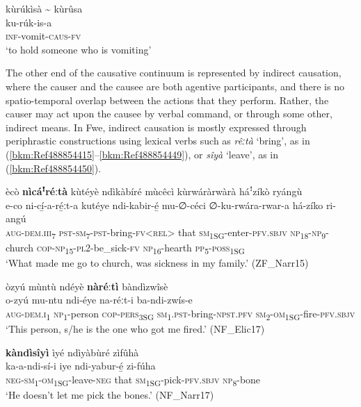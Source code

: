 \ea
\label{bkm:Ref99027269}
kùrúkìsà {\textasciitilde} kùrûsa\\
ku-rúk-is-a\\
\textsc{inf}-vomit-\textsc{caus}-\textsc{fv}\\
\glt ‘to hold someone who is vomiting’
\z

The other end of the causative continuum is represented by indirect causation, where the causer and the causee are both agentive participants, and there is no spatio-temporal overlap between the actions that they perform. Rather, the causer may act upon the causee by verbal command, or through some other, indirect means. In Fwe, indirect causation is mostly expressed through periphrastic constructions using lexical verbs such as \textit{rêːtà} ‘bring’, as in (\ref{bkm:Ref488854415}--\ref{bkm:Ref488854449}), or \textit{sîyà} ‘leave’, as in (\ref{bkm:Ref488854450}).

\ea
\label{bkm:Ref488854415}
ècò \textbf{nìcáꜝ}\textbf{réːtà} kùtéyè ndìkàbíré mùcêcì kùrwáràrwàrà háꜝzíkò ryángù\\
\gll e-co    ni-cí̲-a-ré̲ːt-a        kutéye ndi-kabir-é̲      mu-∅-céci ∅-ku-rwára-rwar-a    há-zíko  ri-angú \\
\textsc{aug}-\textsc{dem}.\textsc{iii}\textsubscript{7}  \textsc{pst}-\textsc{sm}\textsubscript{7}-\textsc{pst}-bring-\textsc{fv}<\textsc{rel}>  that
\textsc{sm}\textsubscript{1SG}-enter-\textsc{pfv}.\textsc{sbjv}  \textsc{np}\textsubscript{18}-\textsc{np}\textsubscript{9}-church
\textsc{cop}-\textsc{np}\textsubscript{15}-\textsc{pl}2-be\_sick-\textsc{fv}  \textsc{np}\textsubscript{16}-hearth  \textsc{pp}\textsubscript{5}-\textsc{poss}\textsubscript{1SG}\\
\glt ‘What made me go to church, was sickness in my family.’ (ZF\_Narr15)
\z

\ea
\label{bkm:Ref488854449}
òzyú mùntù ndéyè \textbf{nàréːtì} bàndìzwîsè\\
\gll o-zyú    mu-ntu ndi-éye  na-réːt-i      ba-ndi-zwís-e \\
\textsc{aug}-\textsc{dem}.\textsc{i}\textsubscript{1}  \textsc{np}\textsubscript{1}-person
\textsc{cop}-\textsc{pers}\textsubscript{3SG}  \textsc{sm}\textsubscript{1}.\textsc{pst}-bring-\textsc{npst}.\textsc{pfv}  \textsc{sm}\textsubscript{2}-\textsc{om}\textsubscript{1SG}-fire-\textsc{pfv}.\textsc{sbjv}\\
\glt ‘This person, s/he is the one who got me fired.’ (NF\_Elic17)
\z

\ea
\label{bkm:Ref488854450}
\textbf{kàndìsîyì} ìyé ndìyàbùré zìfûhà\\
\gll ka-a-ndi-sí-i      iye  ndi-yabur-é̲    zi-fúha\\
\textsc{neg}-\textsc{sm}\textsubscript{1}-\textsc{om}\textsubscript{1SG}-leave-\textsc{neg}  that  \textsc{sm}\textsubscript{1SG}-pick-\textsc{pfv}.\textsc{sbjv}  \textsc{np}\textsubscript{8}-bone\\
\glt ‘He doesn’t let me pick the bones.’ (NF\_Narr17)
\z

